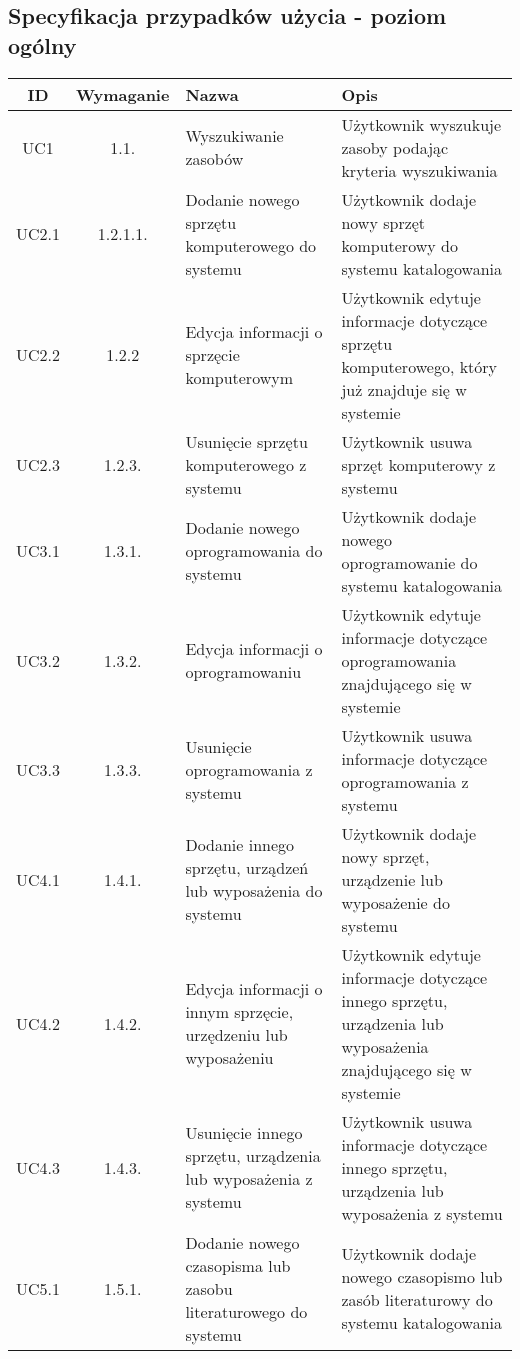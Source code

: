 \subsection{Specyfikacja przypadków użycia - poziom ogólny}
\begin{longtable}{| c | c | p{} | p{} |} 

	\hline \textbf{ID} & \textbf{Wymaganie} & \textbf{Nazwa} & \textbf{Opis} \\ 
	\hline UC1 & 1.1. & Wyszukiwanie zasobów  & Użytkownik wyszukuje zasoby podając kryteria wyszukiwania \\ 
	\hline UC2.1 & 1.2.1.1. & Dodanie nowego sprzętu komputerowego do systemu & Użytkownik dodaje nowy sprzęt komputerowy do systemu katalogowania \\ 
	\hline UC2.2 & 1.2.2 & Edycja informacji o sprzęcie komputerowym & Użytkownik edytuje informacje dotyczące sprzętu komputerowego, który już znajduje się w systemie \\ 
	\hline UC2.3 & 1.2.3. & Usunięcie sprzętu komputerowego z systemu & Użytkownik usuwa sprzęt komputerowy z systemu \\ 
	\hline UC3.1 & 1.3.1. & Dodanie nowego oprogramowania do systemu & Użytkownik dodaje nowego oprogramowanie do systemu katalogowania \\ 
	\hline UC3.2 & 1.3.2. & Edycja informacji o oprogramowaniu & Użytkownik edytuje informacje dotyczące oprogramowania znajdującego się w systemie \\ 
	\hline UC3.3 & 1.3.3. & Usunięcie oprogramowania z systemu & Użytkownik usuwa informacje dotyczące oprogramowania z systemu  \\ 
	\hline UC4.1 & 1.4.1. & Dodanie innego sprzętu, urządzeń lub wyposażenia do systemu & Użytkownik dodaje nowy sprzęt, urządzenie lub wyposażenie do systemu \\ 
	\hline UC4.2 & 1.4.2. & Edycja informacji o innym sprzęcie, urzędzeniu lub wyposażeniu & Użytkownik edytuje informacje dotyczące innego sprzętu, urządzenia lub wyposażenia znajdującego się w systemie \\ 
	\hline UC4.3 & 1.4.3. & Usunięcie innego sprzętu, urządzenia lub wyposażenia z systemu & Użytkownik usuwa informacje dotyczące innego sprzętu, urządzenia lub wyposażenia z systemu \\
	\pagebreak
	UC5.1 & 1.5.1. & Dodanie nowego czasopisma lub zasobu literaturowego do systemu & Użytkownik dodaje nowego czasopismo lub zasób literaturowy do systemu katalogowania \\ 

\end{longtable}

